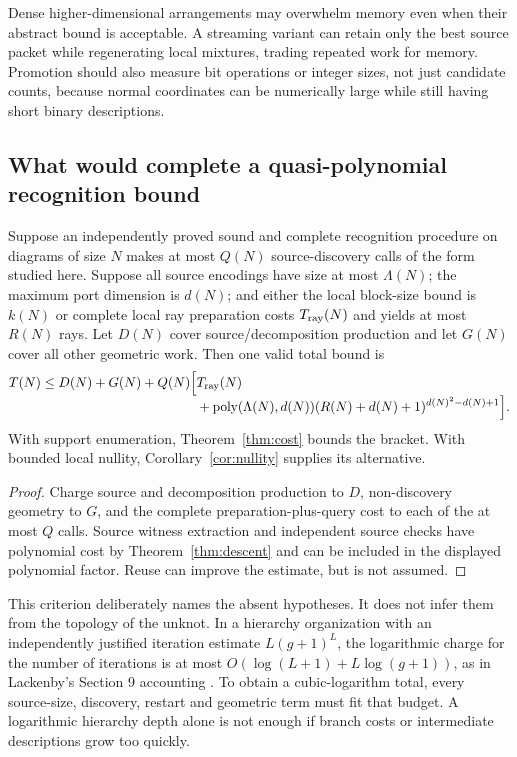 Dense higher-dimensional arrangements may overwhelm memory even when their abstract bound is acceptable. A streaming variant can retain only the best source packet while regenerating local mixtures, trading repeated work for memory. Promotion should also measure bit operations or integer sizes, not just candidate counts, because normal coordinates can be numerically large while still having short binary descriptions.

\subsection{What would complete a quasi-polynomial recognition bound}
\begin{proposition}
\label{prop:accounting}
Suppose an independently proved sound and complete recognition procedure on diagrams of size $N$ makes at most $Q(N)$ source-discovery calls of the form studied here. Suppose all source encodings have size at most $\Lambda(N)$; the maximum port dimension is $d(N)$; and either the local block-size bound is $k(N)$ or complete local ray preparation costs $T_{\rm ray}(N)$ and yields at most $R(N)$ rays. Let $D(N)$ cover source/decomposition production and let $G(N)$ cover all other geometric work. Then one valid total bound is
\begin{align}
 T(N)\le D(N)+G(N)+Q(N)\Bigl[&T_{\rm ray}(N)\\[-4pt]
 &+\operatorname{poly}(\Lambda(N),d(N))(R(N)+d(N)+1)^{d(N)^2-d(N)+1}\Bigr].\nonumber
 \label{eq:composition}
\end{align}
With support enumeration, Theorem~\ref{thm:cost} bounds the bracket. With bounded local nullity, Corollary~\ref{cor:nullity} supplies its alternative.
\end{proposition}
\begin{proof}
Charge source and decomposition production to $D$, non-discovery geometry to $G$, and the complete preparation-plus-query cost to each of the at most $Q$ calls. Source witness extraction and independent source checks have polynomial cost by Theorem~\ref{thm:descent} and can be included in the displayed polynomial factor. Reuse can improve the estimate, but is not assumed.
\end{proof}

This criterion deliberately names the absent hypotheses. It does not infer them from the topology of the unknot. In a hierarchy organization with an independently justified iteration estimate $L(g+1)^L$, the logarithmic charge for the number of iterations is at most $O(\log(L+1)+L\log(g+1))$, as in Lackenby's Section 9 accounting \cite{lack2026}. To obtain a cubic-logarithm total, every source-size, discovery, restart and geometric term must fit that budget. A logarithmic hierarchy depth alone is not enough if branch costs or intermediate descriptions grow too quickly.

